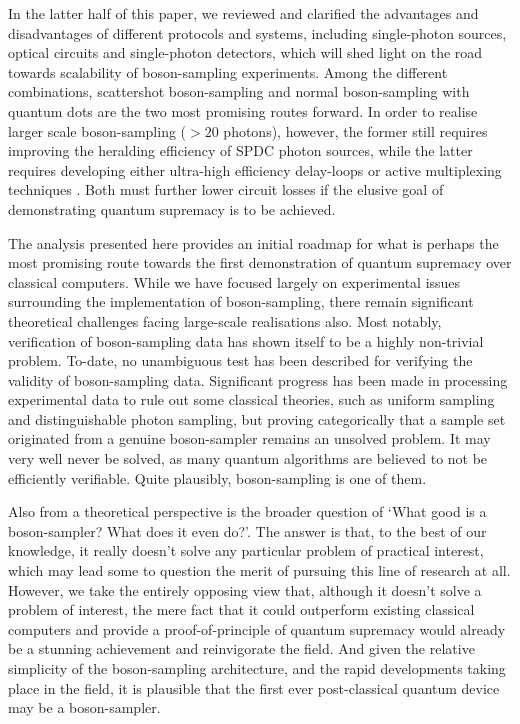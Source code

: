 \documentclass[aps,rmp,twocolumn,amsmath,amssymb,nofootinbib,superscriptaddress]{revtex4}
\begin{document}
In the latter half of this paper, we reviewed and clarified the advantages and disadvantages of different protocols and systems, including single-photon sources, optical circuits and single-photon detectors, which will shed light on the road towards scalability of boson-sampling experiments. Among the different combinations, scattershot boson-sampling and normal boson-sampling with quantum dots are the two most promising routes forward. In order to realise larger scale boson-sampling ($>20$ photons), however, the former still requires improving the heralding efficiency of SPDC photon sources, while the latter requires developing either ultra-high efficiency delay-loops or active multiplexing techniques \cite{bib:89}. Both must further lower circuit losses if the elusive goal of demonstrating quantum supremacy is to be achieved.

The analysis presented here provides an initial roadmap for what is perhaps the most promising route towards the first demonstration of quantum supremacy over classical computers. While we have focused largely on experimental issues surrounding the implementation of boson-sampling, there remain significant theoretical challenges facing large-scale realisations also. Most notably, verification of boson-sampling data has shown itself to be a highly non-trivial problem. To-date, no unambiguous test has been described for verifying the validity of boson-sampling data. Significant progress has been made in processing experimental data to rule out some classical theories, such as uniform sampling and distinguishable photon sampling, but proving categorically that a sample set originated from a genuine boson-sampler remains an unsolved problem. It may very well never be solved, as many quantum algorithms are believed to not be efficiently verifiable. Quite plausibly, boson-sampling is one of them.

Also from a theoretical perspective is the broader question of `What good is a boson-sampler? What does it even do?'. The answer is that, to the best of our knowledge, it really doesn't solve any particular problem of practical interest, which may lead some to question the merit of pursuing this line of research at all. However, we take the entirely opposing view that, although it doesn't solve a problem of interest, the mere fact that it could outperform existing classical computers and provide a proof-of-principle of quantum supremacy would already be a stunning achievement and reinvigorate the field. And given the relative simplicity of the boson-sampling architecture, and the rapid developments taking place in the field, it is plausible that the first ever post-classical quantum device may be a boson-sampler.
\end{document}
